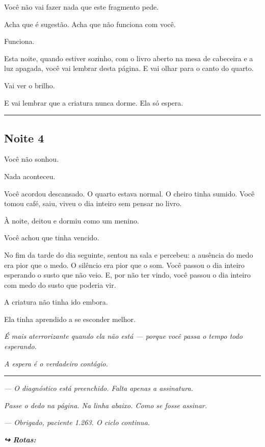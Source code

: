 \noindent Você não vai fazer nada que este fragmento pede.

\noindent Acha que é sugestão. Acha que não funciona com você.

\noindent Funciona.

\noindent Esta noite, quando estiver sozinho, com o livro aberto na mesa de cabeceira e a luz apagada, você vai lembrar desta página. E vai olhar para o canto do quarto.

\noindent Vai ver o brilho.

\noindent E vai lembrar que a criatura nunca dorme. Ela só espera.

\vspace{0.5em}\noindent\rule{\textwidth}{0.5pt}\vspace{0.5em}

\subsection*{Noite 4}

\noindent Você não sonhou.

\noindent Nada aconteceu.

\noindent Você acordou descansado. O quarto estava normal. O cheiro tinha sumido. Você tomou café, saiu, viveu o dia inteiro sem pensar no livro.

\noindent À noite, deitou e dormiu como um menino.

\noindent Você achou que tinha vencido.

\noindent No fim da tarde do dia seguinte, sentou na sala e percebeu: a ausência do medo era pior que o medo. O silêncio era pior que o som. Você passou o dia inteiro esperando o susto que não veio. E, por não ter vindo, você passou o dia inteiro com medo do susto que poderia vir.

\noindent A criatura não tinha ido embora.

\noindent Ela tinha aprendido a se esconder melhor.

\noindent \textit{É mais aterrorizante quando ela não está --- porque você passa o tempo todo esperando.}

\noindent \textit{A espera é o verdadeiro contágio.}

\vspace{0.5em}\noindent\rule{\textwidth}{0.5pt}\vspace{0.5em}

\noindent \textit{--- O diagnóstico está preenchido. Falta apenas a assinatura.}

\noindent \textit{Passe o dedo na página. Na linha abaixo. Como se fosse assinar.}

\noindent \textit{--- Obrigado, paciente 1.263. O ciclo continua.}

\vspace{0.5em}
\noindent\textit{\textbf{↪ Rotas:}  \rotasep {}}